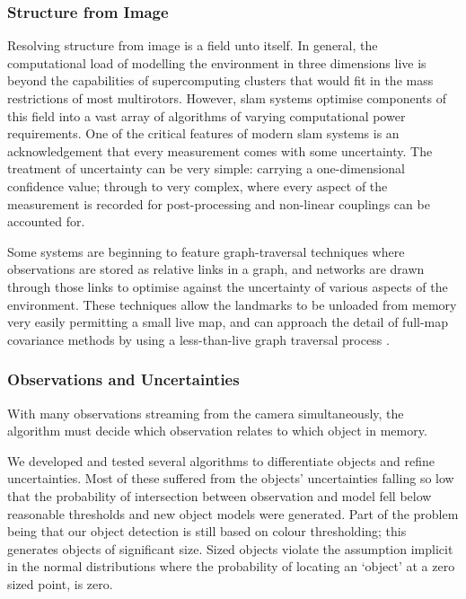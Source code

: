 \documentclass[a4paper, 11pt, titlepage]{article}
\newcounter{subsubsubsection}[subsubsection]
\begin{document}
    \subsubsection{Structure from Image}
      Resolving structure from image is a field unto itself.  In general, the computational load of modelling the environment in three dimensions live is beyond the capabilities of supercomputing clusters that would fit in the mass restrictions of most multirotors.  However, \gls{slam} systems optimise components of this field into a vast array of algorithms of varying computational power requirements.
      One of the critical features of modern \gls{slam} systems is an acknowledgement that every measurement comes with some uncertainty. 
      The treatment of uncertainty can be very simple: carrying a one-dimensional confidence value; through to very complex, where every aspect of the measurement is recorded for post-processing and non-linear couplings can be accounted for.

      Some systems are beginning to feature graph-traversal techniques where observations are stored as relative links in a graph, and networks are drawn through those links to optimise against the uncertainty of various aspects of the environment.  These techniques allow the landmarks to be unloaded from memory very easily permitting a small live map, and can approach the detail of full-map covariance methods by using a less-than-live graph traversal process \cite{SLAMgraph}.

    \subsubsection{Observations and Uncertainties}
    \label{sec:ObsAndUnc}
        \label{sec:objectAllocation}
        With many observations streaming from the camera simultaneously, the algorithm must decide which observation relates to which object in memory.

        We developed and tested several algorithms to differentiate objects and refine uncertainties.
        Most of these suffered from the objects' uncertainties falling so low that the probability of intersection between observation and model fell below reasonable thresholds and new object models were generated.  Part of the problem being that our object detection is still based on colour thresholding; this generates objects of significant size.  Sized objects violate the assumption implicit in the normal distributions where the probability of locating an `object' at a zero sized point, is zero.
\end{document}
